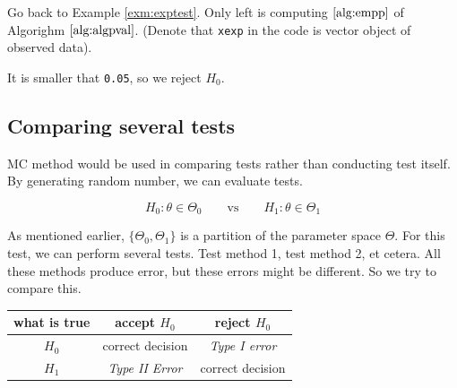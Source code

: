 \documentclass[]{book}
\newenvironment{Shaded}{\begin{snugshade}}{\end{snugshade}}
\newcommand{\CommentTok}[1]{\textcolor[rgb]{0.56,0.35,0.01}{\textit{#1}}}
\newcommand{\DataTypeTok}[1]{\textcolor[rgb]{0.13,0.29,0.53}{#1}}
\newcommand{\DecValTok}[1]{\textcolor[rgb]{0.00,0.00,0.81}{#1}}
\newcommand{\FloatTok}[1]{\textcolor[rgb]{0.00,0.00,0.81}{#1}}
\newcommand{\KeywordTok}[1]{\textcolor[rgb]{0.13,0.29,0.53}{\textbf{#1}}}
\newcommand{\NormalTok}[1]{#1}
\newcommand{\OperatorTok}[1]{\textcolor[rgb]{0.81,0.36,0.00}{\textbf{#1}}}
\newcommand{\StringTok}[1]{\textcolor[rgb]{0.31,0.60,0.02}{#1}}
\theoremstyle{definition}
\theoremstyle{definition}
\theoremstyle{definition}
\theoremstyle{remark}
\begin{document}
Go back to Example \ref{exm:exptest}. Only left is computing \(\ref{alg:empp}\) of Algorighm \(\ref{alg:algpval}\). (Denote that \texttt{xexp} in the code is vector object of observed data).

\begin{Shaded}
\end{Shaded}

It is smaller that \texttt{0.05}, so we reject \(H_0\).

\hypertarget{comparing-several-tests}{%
\subsection{Comparing several tests}\label{comparing-several-tests}}

MC method would be used in comparing tests rather than conducting test itself. By generating random number, we can evaluate tests.

\[H_0: \theta \in \Theta_0 \qquad \text{vs} \qquad H_1: \theta \in \Theta_1\]

As mentioned earlier, \(\{ \Theta_0, \Theta_1 \}\) is a partition of the parameter space \(\Theta\). For this test, we can perform several tests. Test method 1, test method 2, et cetera. All these methods produce error, but these errors might be different. So we try to compare this.

\begin{longtable}[]{@{}ccc@{}}
\toprule
what is true & accept \(H_0\) & reject \(H_0\)\tabularnewline
\midrule
\endhead
\(H_0\) & correct decision & \emph{Type I error}\tabularnewline
\(H_1\) & \emph{Type II Error} & correct decision\tabularnewline
\bottomrule
\end{longtable}
\end{document}
